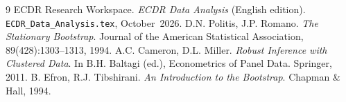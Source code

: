 \documentclass[11pt, a4paper]{article}
\theoremstyle{definition}
\theoremstyle{plain}
\newcommand{\code}[1]{\texttt{#1}}
\begin{document}
\begin{thebibliography}{9}
  ECDR Research Workspace. \textit{ECDR Data Analysis} (English edition).
  \code{ECDR\_Data\_Analysis.tex}, October~2026.
  D.N. Politis, J.P. Romano.
  \textit{The Stationary Bootstrap}.
  Journal of the American Statistical Association, 89(428):1303--1313, 1994.
  A.C. Cameron, D.L. Miller.
  \textit{Robust Inference with Clustered Data}.
  In B.H. Baltagi (ed.), Econometrics of Panel Data. Springer, 2011.
  B. Efron, R.J. Tibshirani.
  \textit{An Introduction to the Bootstrap}. Chapman \& Hall, 1994.
\end{thebibliography}
\end{document}
